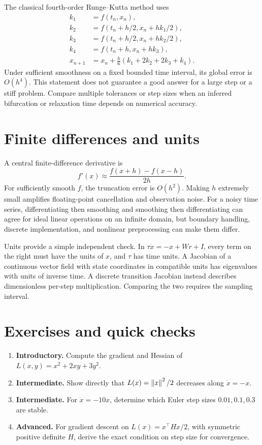 The classical fourth-order Runge--Kutta method uses
\begin{align*}
k_1&=f(t_n,x_n),\\
k_2&=f(t_n+h/2,x_n+hk_1/2),\\
k_3&=f(t_n+h/2,x_n+hk_2/2),\\
k_4&=f(t_n+h,x_n+hk_3),\\
x_{n+1}&=x_n+\frac h6(k_1+2k_2+2k_3+k_4).
\end{align*}
Under sufficient smoothness on a fixed bounded time interval, its global error is \(O(h^4)\). This statement does not guarantee a good answer for a large step or a stiff problem. Compare multiple tolerances or step sizes when an inferred bifurcation or relaxation time depends on numerical accuracy.

\section{Finite differences and units}
A central finite-difference derivative is
\[
f'(x)\approx\frac{f(x+h)-f(x-h)}{2h}.
\]
For sufficiently smooth \(f\), the truncation error is \(O(h^2)\). Making \(h\) extremely small amplifies floating-point cancellation and observation noise. For a noisy time series, differentiating then smoothing and smoothing then differentiating can agree for ideal linear operations on an infinite domain, but boundary handling, discrete implementation, and nonlinear preprocessing can make them differ.

Units provide a simple independent check. In \(\tau\dot x=-x+Wr+I\), every term on the right must have the units of \(x\), and \(\tau\) has time units. A Jacobian of a continuous vector field with state coordinates in compatible units has eigenvalues with units of inverse time. A discrete transition Jacobian instead describes dimensionless per-step multiplication. Comparing the two requires the sampling interval.

\section*{Exercises and quick checks}
\begin{enumerate}
\item \textbf{Introductory.} Compute the gradient and Hessian of \(L(x,y)=x^2+2xy+3y^2\).
\item \textbf{Intermediate.} Show directly that \(L(x)=\left\lVert x\right\rVert^2/2\) decreases along \(\dot x=-x\).
\item \textbf{Intermediate.} For \(\dot x=-10x\), determine which Euler step sizes \(0.01,0.1,0.3\) are stable.
\item \textbf{Advanced.} For gradient descent on \(L(x)=x^\top Hx/2\), with symmetric positive definite \(H\), derive the exact condition on step size for convergence.
\end{enumerate}
